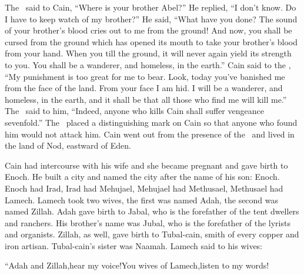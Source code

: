 \begin{inparaenum}
   The \lord\ said to Cain, ``Where is your brother Abel?'' He replied, ``I don't know. Do I have to keep watch of my brother?''%
   He said, ``What have you done? The sound of your brother's blood cries out to me from the ground!%
   And now, you shall be cursed from the ground which has opened its mouth to take your brother's blood from your hand.%
   When you till the ground, it will never again yield its strength to you. You shall be a wanderer, and homeless, in the earth.''%
   Cain said to the \lord, ``My punishment is too great for me to bear.%
   Look, today you've banished me from the face of the land. From your face I am hid. I will be a wanderer, and homeless, in the earth, and it shall be that all those who find me will kill me.''%
   The \lord\ said to him, ``Indeed, anyone who kills Cain shall suffer vengeance sevenfold.'' The \lord\ placed a distinguishing mark on Cain so that anyone who found him would not attack him.%
   Cain went out from the presence of the \lord\ and lived in the land of Nod, eastward of Eden.%
  
   Cain had intercourse with his wife and she became pregnant and gave birth to Enoch. He built a city and named the city after the name of his son: Enoch.%
   Enoch had Irad, Irad had Mehujael, Mehujael had Methusael, Methusael had Lamech.%
   Lamech took two wives, the first was named Adah, the second was named Zillah.%
   Adah gave birth to Jabal, who is the forefather of the tent dwellers and ranchers.%
   His brother's name was Jubal, who is the forefather of the lyrists and organists.%
   Zillah, as well, gave birth to Tubal-cain, smith of every copper and iron artisan. Tubal-cain's sister was Naamah.%
   Lamech said to his wives:\smallskip%
  
  \pb ``Adah and Zillah,\pa hear my voice!\pa You wives of Lamech,\pa listen to my words!%
  

\end{inparaenum}
